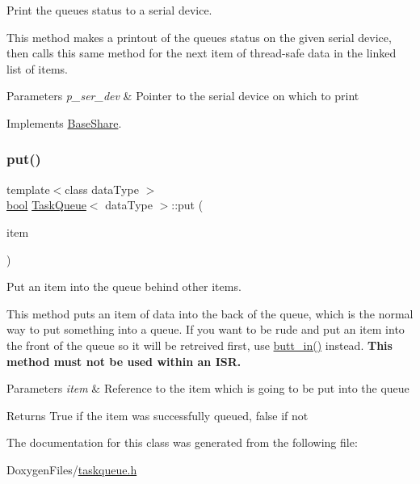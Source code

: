 Print the queue\textquotesingle{}s status to a serial device. 

This method makes a printout of the queue\textquotesingle{}s status on the given serial device, then calls this same method for the next item of thread-\/safe data in the linked list of items. 
\begin{DoxyParams}{Parameters}
{\em p\+\_\+ser\+\_\+dev} & Pointer to the serial device on which to print \\
\hline
\end{DoxyParams}


Implements \mbox{\hyperlink{class_base_share_a81ef685c8c1897ee316e853103e9941a}{Base\+Share}}.

\mbox{\label{class_task_queue_ad1dac62fcf253ab0cf50e47654c5fb29}} 
\subsubsection{\texorpdfstring{put()}{put()}}
{\footnotesize\ttfamily template$<$class data\+Type $>$ \\
\mbox{\hyperlink{group___motor___boolean___type_ga0ecf26b576b9a54eca656b9be7ba6a06}{bool}} \mbox{\hyperlink{class_task_queue}{Task\+Queue}}$<$ data\+Type $>$\+::put (\begin{DoxyParamCaption}\item[{const data\+Type \&}]{item }\end{DoxyParamCaption})}



Put an item into the queue behind other items. 

This method puts an item of data into the back of the queue, which is the normal way to put something into a queue. If you want to be rude and put an item into the front of the queue so it will be retreived first, use {\ttfamily \mbox{\hyperlink{class_task_queue_a7c2810b4a2137dd88bc72fd1f20d18eb}{butt\+\_\+in()}}} instead. {\bfseries This method must not be used within an I\+SR.} 
\begin{DoxyParams}{Parameters}
{\em item} & Reference to the item which is going to be put into the queue \\
\hline
\end{DoxyParams}
\begin{DoxyReturn}{Returns}
True if the item was successfully queued, false if not 
\end{DoxyReturn}


The documentation for this class was generated from the following file\+:\begin{DoxyCompactItemize}
\item 
Doxygen\+Files/\mbox{\hyperlink{taskqueue_8h}{taskqueue.\+h}}\end{DoxyCompactItemize}
